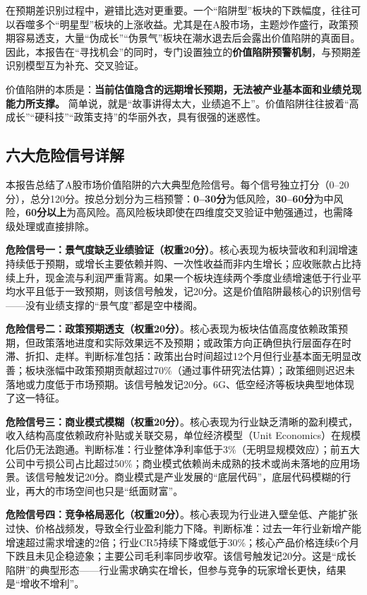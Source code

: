在预期差识别过程中，避错比选对更重要。一个“陷阱型”板块的下跌幅度，往往可以吞噬多个“明星型”板块的上涨收益。尤其是在A股市场，主题炒作盛行，政策预期容易透支，大量“伪成长”“伪景气”板块在潮水退去后会露出价值陷阱的真面目。因此，本报告在“寻找机会”的同时，专门设置独立的\textbf{价值陷阱预警机制}，与预期差识别模型互为补充、交叉验证。

价值陷阱的本质是：\textbf{当前估值隐含的远期增长预期，无法被产业基本面和业绩兑现能力所支撑。} 简单说，就是“故事讲得太大，业绩追不上”。价值陷阱往往披着“高成长”“硬科技”“政策支持”的华丽外衣，具有很强的迷惑性。

\subsection{六大危险信号详解}

本报告总结了A股市场价值陷阱的六大典型危险信号。每个信号独立打分（0--20分），总分120分。按总分划分为三档预警：\textbf{0--30分}为低风险，\textbf{30--60分}为中风险，\textbf{60分以上}为高风险。高风险板块即使在四维度交叉验证中勉强通过，也需降级处理或直接排除。

\textbf{危险信号一：景气度缺乏业绩验证（权重20分）}。核心表现为板块营收和利润增速持续低于预期，或增长主要依赖并购、一次性收益而非内生增长；应收账款占比持续上升，现金流与利润严重背离。如果一个板块连续两个季度业绩增速低于行业平均水平且低于一致预期，则该信号触发，记20分。这是价值陷阱最核心的识别信号——没有业绩支撑的“景气度”都是空中楼阁。

\textbf{危险信号二：政策预期透支（权重20分）}。核心表现为板块估值高度依赖政策预期，但政策落地进度和实际效果远不及预期；或政策方向正确但执行层面存在时滞、折扣、走样。判断标准包括：政策出台时间超过12个月但行业基本面无明显改善；板块涨幅中政策预期贡献超过70\%（通过事件研究法估算）；政策细则迟迟未落地或力度低于市场预期。该信号触发记20分。6G、低空经济等板块典型地体现了这一特征。

\textbf{危险信号三：商业模式模糊（权重20分）}。核心表现为行业缺乏清晰的盈利模式，收入结构高度依赖政府补贴或关联交易，单位经济模型（Unit Economics）在规模化后仍无法跑通。判断标准：行业整体净利率低于3\%（无明显规模效应）；前五大公司中亏损公司占比超过50\%；商业模式依赖尚未成熟的技术或尚未落地的应用场景。该信号触发记20分。商业模式是产业发展的“底层代码”，底层代码模糊的行业，再大的市场空间也只是“纸面财富”。

\textbf{危险信号四：竞争格局恶化（权重20分）}。核心表现为行业进入壁垒低、产能扩张过快、价格战频发，导致全行业盈利能力下降。判断标准：过去一年行业新增产能增速超过需求增速的2倍；行业CR5持续下降或低于30\%；核心产品价格连续6个月下跌且未见企稳迹象；主要公司毛利率同步收窄。该信号触发记20分。这是“成长陷阱”的典型形态——行业需求确实在增长，但参与竞争的玩家增长更快，结果是“增收不增利”。


